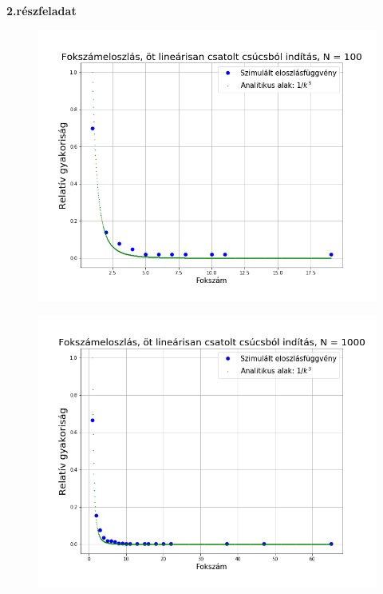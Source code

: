 \documentclass[a4paper, 12pt]{article}
\numberwithin{equation}{section}          %
\numberwithin{figure}{subsection}
\begin{document}
\clearpage

\textbf{2.részfeladat}\newline

\begin{figure}[ch!]
	\begin{center}
		\includegraphics[width=1\textwidth]{masodik100.png}
	\end{center}
\end{figure}
\clearpage
\begin{figure}[c!]
	\begin{center}
		\includegraphics[width=1\textwidth]{masodik1000.png}
	\end{center}
\end{figure}
\end{document}
